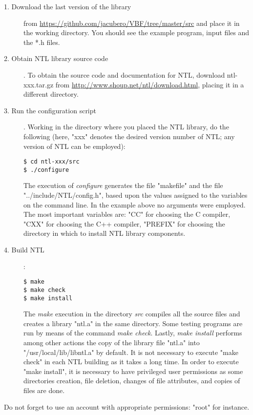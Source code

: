 \begin{description}
\item[1. Download the last version of the library] from \url{https://github.com/jacubero/VBF/tree/master/src} and place it in the working directory. You should see the example program, input files and the *.h files.

\item[2. Obtain NTL library source code]. To obtain the source code and documentation for NTL, download ntl-xxx.tar.gz from \url{http://www.shoup.net/ntl/download.html}, placing it in a different directory.

\item[3. Run the configuration script]. Working in the directory where you placed the NTL library, do the following (here, "xxx" denotes the desired version number of NTL; any version of NTL can be employed):

\begin{verbatim}
$ cd ntl-xxx/src
$ ./configure
\end{verbatim}

The execution of {\em configure\/} generates the file "makefile" and the file "../include/NTL/config.h", based upon the values assigned to the variables on the command line. In the example above no arguments were employed. The most important variables are: "CC" for choosing the C compiler,
"CXX" for choosing the C++ compiler, "PREFIX" for choosing the directory in which to install NTL library components.

\item[4. Build NTL]:
\begin{verbatim}
$ make
$ make check
$ make install
\end{verbatim}

The {\em make\/} execution in the directory {\em src\/} compiles all the source files and creates a library "ntl.a" in the same directory. Some testing programs are run by means of the command {\em make check\/}. Lastly, {\em make install\/} performs among other actions the copy of the library file "ntl.a" into "/usr/local/lib/libntl.a" by default. It is not necessary to execute "make check" in each NTL building as it takes a long time. In order to execute "make install", it is necessary to have privileged user permissions as some directories creation, file deletion, changes of file attributes, and copies of files are done.

\end{description}

Do not forget to use an account with appropriate permissions: "root" for instance.

